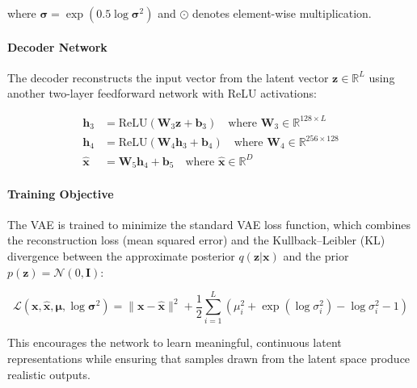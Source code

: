 \documentclass{article}
\begin{document}
where $\boldsymbol{\sigma} = \exp(0.5 \log \boldsymbol{\sigma}^2)$ and $\odot$ denotes element-wise multiplication.

\paragraph{Decoder Network}

The decoder reconstructs the input vector from the latent vector $\mathbf{z} \in \mathbb{R}^L$ using another two-layer feedforward network with ReLU activations:

\begin{align}
\mathbf{h}_3 &= \text{ReLU}(\mathbf{W}_3 \mathbf{z} + \mathbf{b}_3) \quad \text{where } \mathbf{W}_3 \in \mathbb{R}^{128 \times L} \\
\mathbf{h}_4 &= \text{ReLU}(\mathbf{W}_4 \mathbf{h}_3 + \mathbf{b}_4) \quad \text{where } \mathbf{W}_4 \in \mathbb{R}^{256 \times 128} \\
\hat{\mathbf{x}} &= \mathbf{W}_5 \mathbf{h}_4 + \mathbf{b}_5 \quad \text{where } \hat{\mathbf{x}} \in \mathbb{R}^D
\end{align}

\paragraph{Training Objective}\label{prior_dist}

The VAE is trained to minimize the standard VAE loss function, which combines the reconstruction loss (mean squared error) and the Kullback--Leibler (KL) divergence between the approximate posterior $q(\mathbf{z}|\mathbf{x})$ and the prior $p(\mathbf{z}) = \mathcal{N}(0, \mathbf{I})$:

\begin{equation}\label{eq:VAE_loss_function}
\mathcal{L}(\mathbf{x}, \hat{\mathbf{x}}, \boldsymbol{\mu}, \log \boldsymbol{\sigma}^2) = \| \mathbf{x} - \hat{\mathbf{x}} \|^2 + \frac{1}{2} \sum_{i=1}^{L} \left( \mu_i^2 + \exp(\log \sigma_i^2) - \log \sigma_i^2 - 1 \right)
\end{equation}

This encourages the network to learn meaningful, continuous latent representations while ensuring that samples drawn from the latent space produce realistic outputs.
\end{document}
